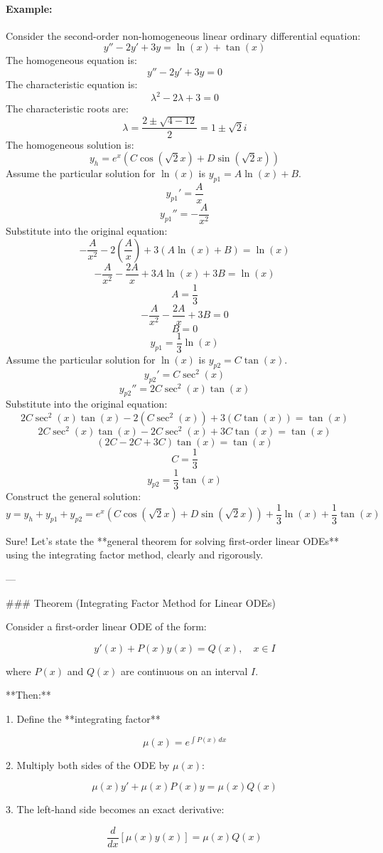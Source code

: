 \paragraph*{Example:}
Consider the second-order non-homogeneous linear ordinary differential equation:
\[y''-2y'+3y=\ln(x)+\tan(x)\]
The homogeneous equation is:
\[y''-2y'+3y=0\]
The characteristic equation is:
\[\lambda^2-2\lambda+3=0\]
The characteristic roots are:
\[\lambda=\frac{2\pm\sqrt{4-12}}{2}=1\pm\sqrt{2}i\]
The homogeneous solution is:
\[y_h=e^x(C\cos(\sqrt{2}x)+D\sin(\sqrt{2}x))\]
Assume the particular solution for $\ln(x)$ is $y_{p1}=A\ln(x)+B$.
\[y_{p1}'=\frac{A}{x}\]
\[y_{p1}''=-\frac{A}{x^2}\]
Substitute into the original equation:
\[-\frac{A}{x^2}-2\left(\frac{A}{x}\right)+3(A\ln(x)+B)=\ln(x)\]
\[-\frac{A}{x^2}-\frac{2A}{x}+3A\ln(x)+3B=\ln(x)\]
\[A=\frac{1}{3}\]
\[-\frac{A}{x^2}-\frac{2A}{x}+3B=0\]
\[B=0\]
\[y_{p1}=\frac{1}{3}\ln(x)\]
Assume the particular solution for $\ln(x)$ is $y_{p2}=C\tan(x)$.
\[y_{p2}'=C\sec^2(x)\]
\[y_{p2}''=2C\sec^2(x)\tan(x)\]
Substitute into the original equation:
\[2C\sec^2(x)\tan(x)-2(C\sec^2(x))+3(C\tan(x))=\tan(x)\]
\[2C\sec^2(x)\tan(x)-2C\sec^2(x)+3C\tan(x)=\tan(x)\]
\[(2C-2C+3C)\tan(x)=\tan(x)\]
\[C=\frac{1}{3}\]
\[y_{p2}=\frac{1}{3}\tan(x)\]
Construct the general solution:
\[y=y_h+y_{p1}+y_{p2}=e^x(C\cos(\sqrt{2}x)+D\sin(\sqrt{2}x))+\frac{1}{3}\ln(x)+\frac{1}{3}\tan(x)\]




Sure! Let’s state the **general theorem for solving first-order linear ODEs** using the integrating factor method, clearly and rigorously.

---

### Theorem (Integrating Factor Method for Linear ODEs)

Consider a first-order linear ODE of the form:

$$
y'(x) + P(x) y(x) = Q(x), \quad x \in I
$$

where $P(x)$ and $Q(x)$ are continuous on an interval $I$.

**Then:**

1. Define the **integrating factor**

$$
\mu(x) = e^{\int P(x)\, dx}
$$

2. Multiply both sides of the ODE by $\mu(x)$:

$$
\mu(x) y' + \mu(x) P(x) y = \mu(x) Q(x)
$$

3. The left-hand side becomes an exact derivative:

$$
\frac{d}{dx}[\mu(x) y(x)] = \mu(x) Q(x)
$$

